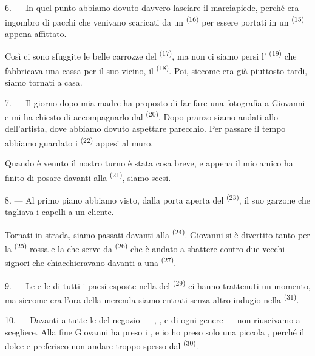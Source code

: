6. --- In quel punto abbiamo dovuto davvero lasciare il marciapiede, perché era
ingombro di pacchi che venivano scaricati da un 
\textsuperscript{(16)} per essere portati in un 
\textsuperscript{(15)} appena affittato.

Così ci sono sfuggite le belle carrozze del 
\textsuperscript{(17)}, ma non ci siamo persi l'
\textsuperscript{(19)} che fabbricava una cassa per il suo vicino, il
 \textsuperscript{(18)}. Poi, siccome era
già piuttosto tardi, siamo tornati a casa.

\VUsaut{3.0mm}

7. --- Il giorno dopo mia madre ha proposto di far fare una fotografia a Giovanni e mi
ha chiesto di accompagnarlo dal  \textsuperscript{(20)}. Dopo pranzo
siamo andati allo  dell'artista, dove abbiamo dovuto aspettare
parecchio. Per passare il tempo abbiamo guardato i 
\textsuperscript{(22)} appesi al muro.

Quando è venuto il nostro turno è stata cosa breve, e appena il mio amico ha finito di
posare davanti alla  \textsuperscript{(21)}, siamo scesi.

8. --- Al primo piano abbiamo visto, dalla porta aperta del 
\textsuperscript{(23)}, il suo garzone che tagliava i capelli a un cliente.

Tornati in strada, siamo passati davanti alla 
\textsuperscript{(24)}. Giovanni si è divertito tanto per la 
\textsuperscript{(25)} rossa e la  che serve da 
\textsuperscript{(26)} che è andato a sbattere contro due vecchi signori che
chiacchieravano davanti a una  \textsuperscript{(27)}.

\VUsaut{3.0mm}

9. --- Le  e le  di tutti i paesi esposte nella
 del  \textsuperscript{(29)} ci hanno trattenuti
un momento, ma siccome era l'ora della merenda siamo entrati senza altro indugio nella
 \textsuperscript{(31)}.

10. --- Davanti a tutte le  del negozio --- ,
,  e  di ogni genere --- non
riuscivamo a scegliere. Alla fine Giovanni ha preso i , e io
ho preso solo una piccola , perché il dolce
 e preferisco non andare troppo spesso dal
 \textsuperscript{(30)}.

